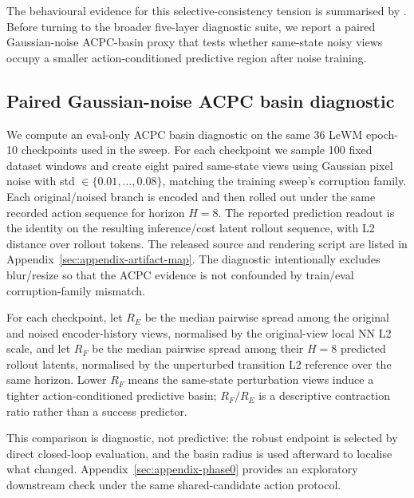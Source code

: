 \documentclass[10pt]{article}
\begin{document}
The behavioural evidence for this selective-consistency tension is summarised by . Before turning to the broader five-layer diagnostic suite, we report a paired Gaussian-noise ACPC-basin proxy that tests whether same-state noisy views occupy a smaller action-conditioned predictive region after noise training.

\subsection{Paired Gaussian-noise ACPC basin diagnostic}\label{sec:exp-acpc-basin}

We compute an eval-only ACPC basin diagnostic on the same 36 LeWM epoch-10 checkpoints used in the sweep. For each checkpoint we sample 100 fixed dataset windows and create eight paired same-state views using Gaussian pixel noise with std $\in \{0.01,\dots,0.08\}$, matching the training sweep's corruption family. Each original/noised branch is encoded and then rolled out under the same recorded action sequence for horizon $H=8$. The reported prediction readout is the identity on the resulting inference/cost latent rollout sequence, with L2 distance over rollout tokens. The released source and rendering script are listed in Appendix~\ref{sec:appendix-artifact-map}. The diagnostic intentionally excludes blur/resize so that the ACPC evidence is not confounded by train/eval corruption-family mismatch.

For each checkpoint, let $R_E$ be the median pairwise spread among the original and noised encoder-history views, normalised by the original-view local NN L2 scale, and let $R_F$ be the median pairwise spread among their $H=8$ predicted rollout latents, normalised by the unperturbed transition L2 reference over the same horizon. Lower $R_F$ means the same-state perturbation views induce a tighter action-conditioned predictive basin; $R_F/R_E$ is a descriptive contraction ratio rather than a success predictor.

This comparison is diagnostic, not predictive: the robust endpoint is selected by direct closed-loop evaluation, and the basin radius is used afterward to localise what changed. Appendix~\ref{sec:appendix-phase0} provides an exploratory downstream check under the same shared-candidate action protocol.
\end{document}
